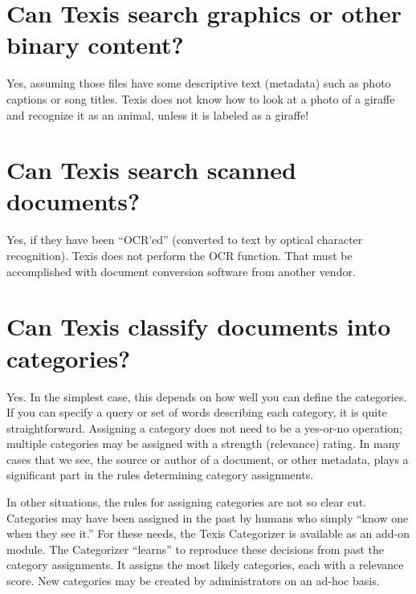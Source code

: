 \section{Can Texis search graphics or other binary content? }

Yes, assuming those files have some descriptive text (metadata) such
as photo captions or song titles.  Texis does not know how to look at
a photo of a giraffe and recognize it as an animal, unless it is
labeled as a giraffe!

\section{Can Texis search scanned documents? }

Yes, if they have been ``OCR'ed'' (converted to text by optical
character recognition).  Texis does not perform the OCR function.
That must be accomplished with document conversion software from
another vendor.

\section{Can Texis classify documents into categories? }

Yes. In the simplest case, this depends on how well you can define the
categories. If you can specify a query or set of words describing each
category, it is quite straightforward.  Assigning a category does not
need to be a yes-or-no operation; multiple categories may be assigned
with a strength (relevance) rating.  In many cases that we see, the
source or author of a document, or other metadata, plays a significant
part in the rules determining category assignments.

In other situations, the rules for assigning categories are not so
clear cut.  Categories may have been assigned in the past by humans
who simply ``know one when they see it.''  For these needs, the Texis
Categorizer is available as an add-on module.  The Categorizer
``learns'' to reproduce these decisions from past the category
assignments.  It assigns the most likely categories, each with a
relevance score. New categories may be created by administrators on an
ad-hoc basis.

